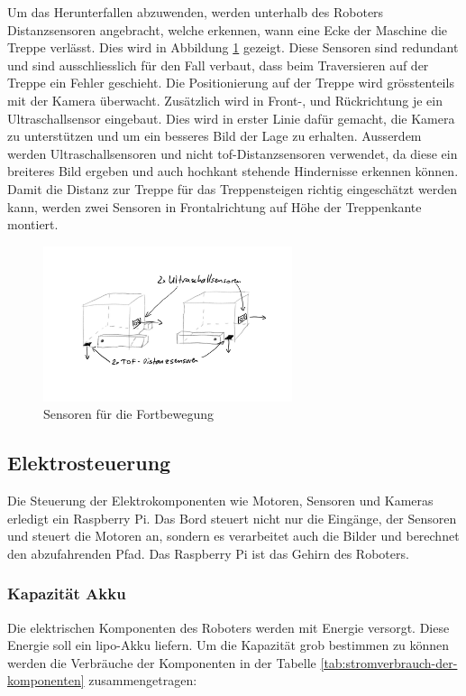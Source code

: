 Um das Herunterfallen abzuwenden, werden unterhalb des Roboters Distanzsensoren angebracht, welche erkennen, wann eine Ecke der Maschine die Treppe verlässt. Dies wird in Abbildung \ref{fig:sensoren-fortbewegung1} gezeigt. Diese Sensoren sind redundant und sind ausschliesslich für den Fall verbaut, dass beim Traversieren auf der Treppe ein Fehler geschieht.
Die Positionierung auf der Treppe wird grösstenteils mit der Kamera überwacht. Zusätzlich wird in Front-, und Rückrichtung je ein Ultraschallsensor eingebaut. Dies wird in erster Linie dafür gemacht, die Kamera zu unterstützen und um ein besseres Bild der Lage zu erhalten. Ausserdem werden Ultraschallsensoren und nicht \acrshort{tof}-Distanzsensoren verwendet, da diese ein breiteres Bild ergeben und auch hochkant stehende Hindernisse erkennen können.
Damit die Distanz zur Treppe für das Treppensteigen richtig eingeschätzt werden kann, werden zwei Sensoren in Frontalrichtung auf Höhe der Treppenkante montiert.

\begin{figure}[h]
  \includegraphics[width=0.65\textwidth]{img/Fortbewegung/Skizze_Sensoren_Fortbewegung_1.png}
  \centering
  \caption{Sensoren für die Fortbewegung}
  \label{fig:sensoren-fortbewegung1}
\end{figure}


\subsection{Elektrosteuerung}
Die Steuerung der Elektrokomponenten wie Motoren, Sensoren und Kameras erledigt ein Raspberry Pi. Das Bord steuert nicht nur die Eingänge, der Sensoren und steuert die Motoren an, sondern es verarbeitet auch die Bilder und berechnet den abzufahrenden Pfad. Das Raspberry Pi ist das Gehirn des Roboters.


\subsubsection{Kapazität Akku}
Die elektrischen Komponenten des Roboters werden mit Energie versorgt. Diese Energie soll ein \acrshort{lipo}-Akku liefern. Um die Kapazität grob bestimmen zu können werden die Verbräuche der Komponenten in der Tabelle \ref{tab:stromverbrauch-der-komponenten} zusammengetragen:   

